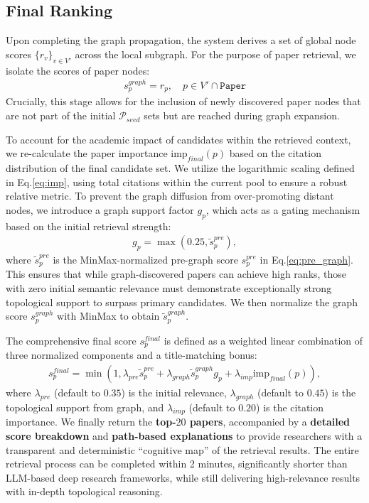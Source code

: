 \documentclass{llmxive}
\begin{document}
\subsection{Final Ranking}
Upon completing the graph propagation, the system derives a set of global node scores $\{r_v\}_{v \in V'}$ across the local subgraph.
For the purpose of paper retrieval, we isolate the scores of paper nodes:
\begin{align}
\label{eq:spgraph}
    s_p^{graph} = r_p, \quad p \in V' \cap \texttt{Paper}
\end{align}
Crucially, this stage allows for the inclusion of newly discovered paper nodes that are not part of the initial $\mathcal{P}_{seed}$ sets but are reached during graph expansion. 

To account for the academic impact of candidates within the retrieved context, we re-calculate the paper importance $\text{imp}_{final}(p)$ based on the citation distribution of the final candidate set.
We utilize the logarithmic scaling defined in Eq.\ref{eq:imp}, using total citations within the current pool to ensure a robust relative metric.
To prevent the graph diffusion from over-promoting distant nodes, we introduce a graph support factor $g_p$, which acts as a gating mechanism based on the initial retrieval strength:
\begin{align}
\label{eq:gp}
    g_p = \max(0.25, \tilde{s}_p^{pre}),
\end{align}
where $\tilde{s}_p^{pre}$ is the MinMax-normalized pre-graph score $s_p^{pre}$ in Eq.\ref{eq:pre_graph}.
This ensures that while graph-discovered papers can achieve high ranks, those with zero initial semantic relevance must demonstrate exceptionally strong topological support to surpass primary candidates.
We then normalize the graph score $s_p^{graph}$ with MinMax to obtain $\tilde{s}_p^{graph}$.

The comprehensive final score $s_p^{final}$ is defined as a weighted linear combination of three normalized components and a title-matching bonus:
\begin{align}
\label{eq:final}
    s_p^{final} = \min\left(1, \lambda_{pre}\tilde{s}_p^{pre} + \lambda_{graph}\tilde{s}_p^{graph} g_p + \lambda_{imp}\text{imp}_{final}(p)\right),
\end{align}
where $\lambda_{pre}$ (default to $0.35$) is the initial relevance, $\lambda_{graph}$ (default to $0.45$) is the topological support from graph, and $\lambda_{imp}$ (default to $0.20$) is the citation importance.
We finally return the \textbf{top-$20$ papers}, accompanied by a \textbf{detailed score breakdown} and \textbf{path-based explanations} to provide researchers with a transparent and deterministic ``cognitive map'' of the retrieval results.
The entire retrieval process can be completed within 2 minutes, significantly shorter than LLM-based deep research frameworks, while still delivering high-relevance results with in-depth topological reasoning.
\end{document}
